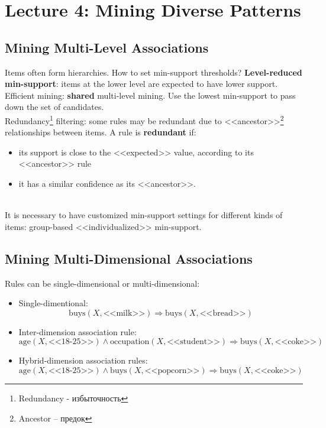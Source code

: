 \section{Lecture 4: Mining Diverse Patterns}

\subsection{Mining Multi-Level Associations}

Items often form hierarchies. How to set min-support thresholds? \textbf{Level-reduced min-support}: items at the lower level are expected to have lower support.\\

Efficient mining: \textbf{shared} multi-level mining. Use the lowest min-support to pass down the set of candidates.\\

Redundancy\footnote{Redundancy - избыточность} filtering: some rules may be redundant due to <<ancestor>>\footnote{Ancestor -- предок} relationships between items. A rule is \textbf{redundant} if:
\begin{itemize}
\item its support is close to the <<expected>> value, according to its <<ancestor>> rule
\item it has a similar confidence as its <<ancestor>>.
\end{itemize}\\

It is necessary to have customized min-support settings for different kinds of items: group-based <<individualized>> min-support.

\subsection{Mining Multi-Dimensional Associations}
Rules can be single-dimensional or multi-dimensional:
\begin{itemize}
\item Single-dimentional: 
\begin{equation*}
\mathrm{buys}(X, \text{<<milk>>}) \Rightarrow \mathrm{buys}(X, \text{<<bread>>})
\end{equation*}
\item Inter-dimension association rule: 
\begin{equation*}
\mathrm{age}(X, \text{<<18-25>>}) \wedge \mathrm{occupation}(X, \text{<<student>>}) \Rightarrow \mathrm{buys}(X, \text{<<coke>>})
\end{equation*}
\item Hybrid-dimension association rules: 
\begin{equation*}
\mathrm{age}(X, \text{<<18-25>>}) \wedge \mathrm{buys}(X, \text{<<popcorn>>}) \Rightarrow \mathrm{buys}(X, \text{<<coke>>})
\end{equation*}
\end{itemize}


